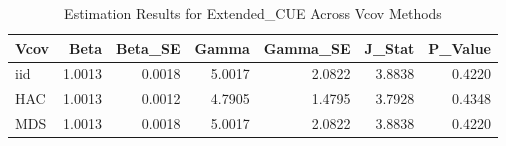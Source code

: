 \begin{table}[ht]
\centering
\begin{tabular}{lrrrrrr}
  \hline
Vcov & Beta & Beta\_SE & Gamma & Gamma\_SE & J\_Stat & P\_Value \\ 
  \hline
iid & 1.0013 & 0.0018 & 5.0017 & 2.0822 & 3.8838 & 0.4220 \\ 
  HAC & 1.0013 & 0.0012 & 4.7905 & 1.4795 & 3.7928 & 0.4348 \\ 
  MDS & 1.0013 & 0.0018 & 5.0017 & 2.0822 & 3.8838 & 0.4220 \\ 
   \hline
\end{tabular}
\caption{Estimation Results for Extended_CUE Across Vcov Methods} 
\label{tab:extendedcue}
\end{table}
